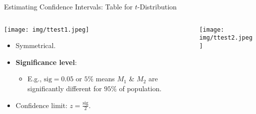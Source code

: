 \begin{frame}{Estimating Confidence Intervals: Table for $t$-Distribution}
	\begin{columns}
		\begin{column}{0.5\textwidth}
			\vspace{-6cm}
			\centering
			\texttt{[image: img/ttest1.jpeg]}
			\begin{itemize}
				\item Symmetrical.
				\item \textbf{\color{airforceblue}Significance level}:
				      \begin{itemize}
					      \item E.g., $\text{sig} = 0.05$ or $5\%$ means $M_1$ \& $M_2$ are significantly different for $95\%$ of population.
				      \end{itemize}
				\item Confidence limit: $z = \frac{\text{sig}}{2}$.
			\end{itemize}
		\end{column}
		\begin{column}{0.5\textwidth}
			\centering
			\texttt{[image: img/ttest2.jpeg]}
		\end{column}
	\end{columns}
\end{frame}

